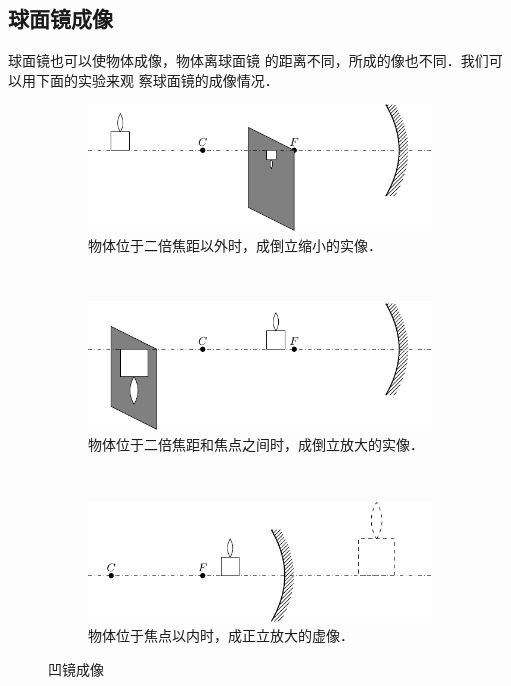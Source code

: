 \subsection{球面镜成像}
球面镜也可以使物体成像，物体离球面镜
的距离不同，所成的像也不同．我们可以用下面的实验来观
察球面镜的成像情况．
\begin{figure}[htbp]
    \centering
    \begin{subfigure}{0.9\linewidth}
        \centering
        \includegraphics{fig/C/5-16a.pdf}
        \caption{物体位于二倍焦距以外时，成倒立缩小的实像．}\label{fig_C_5-16a}
    \end{subfigure}
    \\
    \begin{subfigure}{0.9\linewidth}
        \centering
        \includegraphics{fig/C/5-16b.pdf}
        \caption{物体位于二倍焦距和焦点之间时，成倒立放大的实像．}\label{fig_C_5-16b}
    \end{subfigure}
    \\
    \begin{subfigure}{0.9\linewidth}
        \centering
        \includegraphics{fig/C/5-16c.pdf}
        \caption{物体位于焦点以内时，成正立放大的虚像．}\label{fig_C_5-16c}
    \end{subfigure}
    \caption{凹镜成像}\label{fig_C_5-16}
\end{figure}

